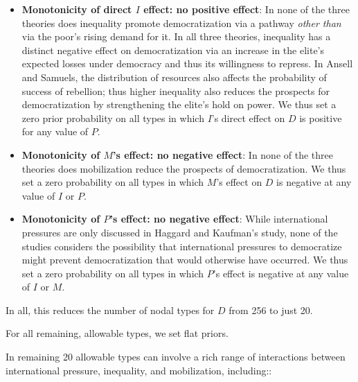 \documentclass[
  12pt,
]{book}
\begin{document}
\begin{itemize}
\item
  \textbf{Monotonicity of direct \(I\) effect: no positive effect}: In none of the three theories does inequality promote democratization via a pathway \emph{other than} via the poor's rising demand for it. In all three theories, inequality has a distinct negative effect on democratization via an increase in the elite's expected losses under democracy and thus its willingness to repress. In Ansell and Samuels, the distribution of resources also affects the probability of success of rebellion; thus higher inequality also reduces the prospects for democratization by strengthening the elite's hold on power. We thus set a zero prior probability on all types in which \(I\)'s direct effect on \(D\) is positive for any value of \(P\).
\item
  \textbf{Monotonicity of \(M\)'s effect: no negative effect}: In none of the three theories does mobilization reduce the prospects of democratization. We thus set a zero probability on all types in which \(M\)'s effect on \(D\) is negative at any value of \(I\) or \(P\).
\item
  \textbf{Monotonicity of \(P\)'s effect: no negative effect}: While international pressures are only discussed in Haggard and Kaufman's study, none of the studies considers the possibility that international pressures to democratize might prevent democratization that would otherwise have occurred. We thus set a zero probability on all types in which \(P\)'s effect is negative at any value of \(I\) or \(M\).
\end{itemize}

In all, this reduces the number of nodal types for \(D\) from 256 to just 20.

For all remaining, allowable types, we set flat priors.

In remaining 20 allowable types can involve a rich range of interactions between international pressure, inequality, and mobilization, including::
\end{document}
